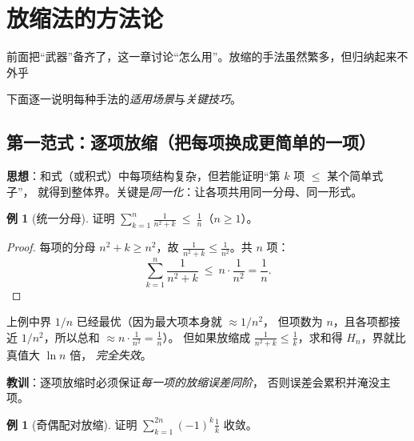 \documentclass[11pt,a4paper]{ctexart}
\theoremstyle{definition}
\newtheorem{example}[theorem]{例}
\theoremstyle{remark}
\begin{document}
\newpage

\section{放缩法的方法论}

前面把“武器”备齐了，这一章讨论“怎么用”。放缩的手法虽然繁多，但归纳起来不外乎
\begin{center}
\end{center}
下面逐一说明每种手法的\emph{适用场景}与\emph{关键技巧}。

\subsection{第一范式：逐项放缩（把每项换成更简单的一项）}

\textbf{思想}：和式（或积式）中每项结构复杂，但若能证明“第 $k$ 项 $\le$ 某个简单式子”，
就得到整体界。关键是\emph{同一化}：让各项共用同一分母、同一形式。

\begin{example}[统一分母]
证明 $\displaystyle\sum_{k=1}^{n}\frac{1}{n^{2}+k}\ \le\ \frac{1}{n}$（$n\ge1$）。
\end{example}

\begin{proof}
每项的分母 $n^2+k\ge n^2$，故 $\frac{1}{n^2+k}\le\frac{1}{n^2}$。共 $n$ 项：
\[
  \sum_{k=1}^{n}\frac{1}{n^{2}+k}\ \le\ n\cdot\frac{1}{n^{2}}=\frac1n .
\]
\end{proof}

\begin{warnbox}
上例中界 $1/n$ 已经最优（因为最大项本身就 $\approx 1/n^2$，
但项数为 $n$，且各项都接近 $1/n^2$，所以总和 $\approx n\cdot\frac{1}{n^2}=\frac1n$）。
但如果放缩成 $\frac{1}{n^2+k}\le\frac{1}{k}$，求和得 $H_n$，界就比真值大 $\ln n$ 倍，
\emph{完全失效}。
\par\smallskip
\textbf{教训}：逐项放缩时必须保证\emph{每一项的放缩误差同阶}，
否则误差会累积并淹没主项。
\end{warnbox}

\begin{example}[奇偶配对放缩]\label{ex:odd-even}
证明 $\displaystyle\sum_{k=1}^{2n}(-1)^{k}\frac{1}{k}$ 收敛。
\end{example}
\end{document}
